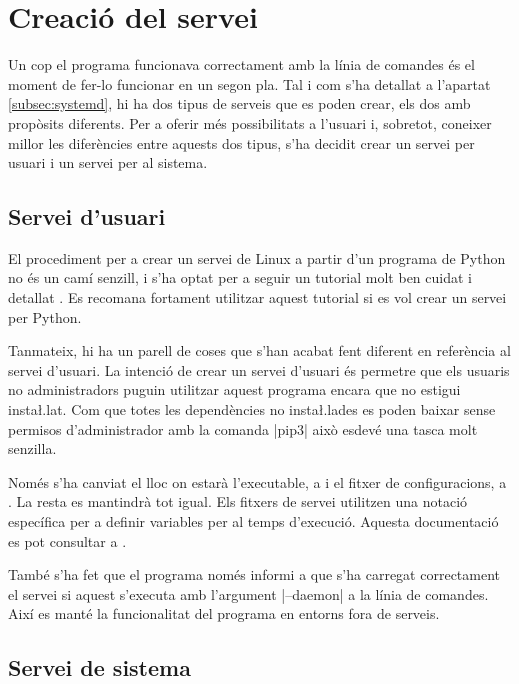 \section{Creació del servei }

Un cop el programa funcionava correctament amb la línia de comandes és el moment
de fer-lo funcionar en un segon pla. Tal i com s'ha detallat a l'apartat
\ref{subsec:systemd}, hi ha dos tipus de serveis que es poden crear, els dos
amb propòsits diferents. Per a oferir més possibilitats a l'usuari i, sobretot,
coneixer millor les diferències entre aquests dos tipus, s'ha decidit crear
un servei per usuari i un servei per al sistema.

\subsection{Servei d'usuari}

El procediment per a crear un servei de Linux a partir d'un programa de Python
no és un camí senzill, i s'ha optat per a seguir un tutorial molt ben cuidat i
detallat \cite{PythonSystemdTutorial}. Es recomana fortament utilitzar aquest
tutorial si es vol crear un servei per Python.

Tanmateix, hi ha un parell de coses que s'han acabat fent diferent en referència
al servei d'usuari. La intenció de crear un servei d'usuari és permetre que els
usuaris no administradors puguin utilitzar aquest programa encara que no estigui
insta\l.lat. Com que totes les dependències no insta\l.lades es poden baixar
sense permisos d'administrador amb la comanda \ord|pip3| això esdevé una tasca
molt senzilla.

Només s'ha canviat el lloc on estarà l'executable, a  i el
fitxer de configuracions, a . La resta es mantindrà
tot igual. Els fitxers de servei utilitzen una notació específica per a
definir variables per al temps d'execució. Aquesta documentació es pot consultar
a \cite{mansystemd}.

També s'ha fet que el programa només informi a  que s'ha carregat
correctament el servei si aquest s'executa amb l'argument \ord|--daemon| a la
línia de comandes. Així es manté la funcionalitat del programa en entorns fora
de serveis.

\subsection{Servei de sistema}
\label{subsec:systemd_system}

